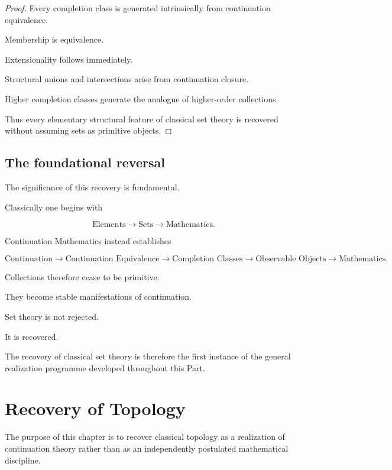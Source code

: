 \documentclass[13pt,openany]{book}
\theoremstyle{plain}
\theoremstyle{definition}
\begin{document}
\begin{proof}
Every completion class is generated intrinsically from continuation
equivalence.

Membership is equivalence.

Extensionality follows immediately.

Structural unions and intersections arise from continuation closure.

Higher completion classes generate the analogue of higher-order collections.

Thus every elementary structural feature of classical set theory is
recovered without assuming sets as primitive objects.
\end{proof}


\section{The foundational reversal}

The significance of this recovery is fundamental.

Classically one begins with

\[
\text{Elements}
\longrightarrow
\text{Sets}
\longrightarrow
\text{Mathematics}.
\]

Continuation Mathematics instead establishes

\[
\text{Continuation}
\longrightarrow
\text{Continuation Equivalence}
\longrightarrow
\text{Completion Classes}
\longrightarrow
\text{Observable Objects}
\longrightarrow
\text{Mathematics}.
\]

Collections therefore cease to be primitive.

They become stable manifestations of continuation.

Set theory is not rejected.

It is recovered.

The recovery of classical set theory is therefore the first instance of the
general realization programme developed throughout this Part.

\chapter{Recovery of Topology}

The purpose of this chapter is to recover classical topology as a realization of continuation theory rather than as an independently postulated mathematical discipline.
\end{document}
